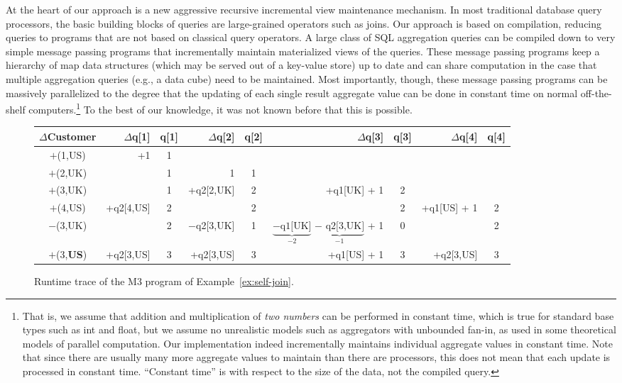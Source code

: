 At the heart of our approach is a new aggressive recursive incremental
view maintenance mechanism.
In most traditional database query processors, the  basic building blocks of
queries are large-grained operators such as joins.
Our approach is based on compilation, reducing
queries to programs that are not based on classical query operators.
A large class of
SQL aggregation queries can be compiled down to very simple message
passing programs that incrementally maintain materialized views of
the queries. These message passing programs keep a hierarchy of map data
structures (which may be served out of a key-value store) up to date
and can share computation in the case that multiple aggregation queries (e.g.,
a data cube) need to be maintained.  Most importantly, though, these message
passing programs can be massively parallelized to the degree that the updating
of each single result aggregate value can be done in constant time on normal
off-the-shelf computers.\footnote{That is,
we assume that addition and multiplication
of {\em two numbers} can be performed in constant time, which is true for
%
%
standard base types such as int and float,
but we assume no unrealistic models such
as aggregators with unbounded fan-in, as used in some theoretical models of
parallel computation. Our implementation indeed incrementally maintains
individual aggregate values in constant time. Note that since there are
usually many more aggregate values to maintain than there are processors,
this does not mean that each update is processed in constant time.
``Constant time'' is with respect to the size of the data, not the compiled
query.}
To the best of our knowledge, it was not known before
that this is possible.

\begin{figure*}[!]
\begin{center}
\begin{tabular}{c|rc|rc|rc|rc}
$\Delta$Customer
& $\Delta$q[1] & q[1]
& $\Delta$q[2] & q[2]
& $\Delta$q[3] & q[3]
& $\Delta$q[4] & q[4] \\
\hline
$+$(1,US) &         +1 & 1 &              &   &              &   &&   \\
$+$(2,UK) &            & 1 &            1 & 1 &              &   &&   \\
$+$(3,UK) &            & 1 &   +q2[2,UK] & 2 & +q1[UK] + 1 & 2 &&   \\
$+$(4,US) & +q2[4,US] & 2 &              & 2 &              & 2 & +q1[US] + 1 & 2 \\
$-$(3,UK) &            & 2 & $-$q2[3,UK] & 1 & $\underbrace{\mbox{$-$q1[UK]}}_{-2}$ $\underbrace{\mbox{$-$ q2[3,UK]}}_{-1}$ + 1 & 0 && 2 \\
$+$(3,{\bf US}) & +q2[3,US] & 3 &   +q2[3,US] & 3 & +q1[US] + 1 & 3 & +q2[3,US] & 3  \\
\end{tabular}
\end{center}

\vspace{-4mm}

\caption{Runtime trace of the M3 program of Example~\ref{ex:self-join}.}
\label{fig:trace}
\end{figure*}


